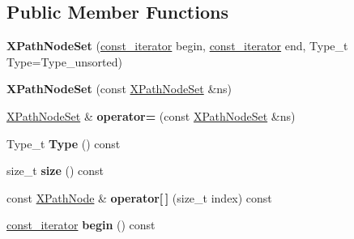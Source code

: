 \subsection*{Public Member Functions}
\begin{DoxyCompactItemize}
\item 
\hypertarget{classphys_1_1xml_1_1XPathNodeSet_a4cb1b2517f4365b87c87ed673e69b65c}{
{\bfseries XPathNodeSet} (\hyperlink{classphys_1_1xml_1_1XPathNode}{const\_\-iterator} begin, \hyperlink{classphys_1_1xml_1_1XPathNode}{const\_\-iterator} end, Type\_\-t Type=Type\_\-unsorted)}
\label{de/dc2/classphys_1_1xml_1_1XPathNodeSet_a4cb1b2517f4365b87c87ed673e69b65c}

\item 
\hypertarget{classphys_1_1xml_1_1XPathNodeSet_af4ac7af973425828bd66dc278887695c}{
{\bfseries XPathNodeSet} (const \hyperlink{classphys_1_1xml_1_1XPathNodeSet}{XPathNodeSet} \&ns)}
\label{de/dc2/classphys_1_1xml_1_1XPathNodeSet_af4ac7af973425828bd66dc278887695c}

\item 
\hypertarget{classphys_1_1xml_1_1XPathNodeSet_ad2faeaf80e93a3576b10908354adface}{
\hyperlink{classphys_1_1xml_1_1XPathNodeSet}{XPathNodeSet} \& {\bfseries operator=} (const \hyperlink{classphys_1_1xml_1_1XPathNodeSet}{XPathNodeSet} \&ns)}
\label{de/dc2/classphys_1_1xml_1_1XPathNodeSet_ad2faeaf80e93a3576b10908354adface}

\item 
\hypertarget{classphys_1_1xml_1_1XPathNodeSet_a025114cccc7621b3e16f33a16a84a43e}{
Type\_\-t {\bfseries Type} () const }
\label{de/dc2/classphys_1_1xml_1_1XPathNodeSet_a025114cccc7621b3e16f33a16a84a43e}

\item 
\hypertarget{classphys_1_1xml_1_1XPathNodeSet_a306178fdaf66f2d0ccefd617f7afc7f3}{
size\_\-t {\bfseries size} () const }
\label{de/dc2/classphys_1_1xml_1_1XPathNodeSet_a306178fdaf66f2d0ccefd617f7afc7f3}

\item 
\hypertarget{classphys_1_1xml_1_1XPathNodeSet_aecd0282913579f27ed0f6de30053f081}{
const \hyperlink{classphys_1_1xml_1_1XPathNode}{XPathNode} \& {\bfseries operator\mbox{[}$\,$\mbox{]}} (size\_\-t index) const }
\label{de/dc2/classphys_1_1xml_1_1XPathNodeSet_aecd0282913579f27ed0f6de30053f081}

\item 
\hypertarget{classphys_1_1xml_1_1XPathNodeSet_abc59bc390d7ac19a1e6cd9d76599c0f6}{
\hyperlink{classphys_1_1xml_1_1XPathNode}{const\_\-iterator} {\bfseries begin} () const }
\label{de/dc2/classphys_1_1xml_1_1XPathNodeSet_abc59bc390d7ac19a1e6cd9d76599c0f6}


\end{DoxyCompactItemize}
